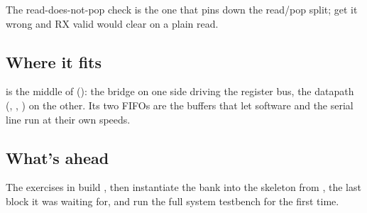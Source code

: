 The read-does-not-pop check is the one that pins down the read/pop split; get it wrong and RX valid
would clear on a plain read.

\subsection{Where it fits}
\label{c5:sec:uart_regs_fits}
 is the middle of  (): the bridge on one side
driving the register bus, the datapath (, , ) on the
other. Its two FIFOs are the buffers that let software and the serial line run at their own speeds.

\subsection{What's ahead}
The exercises in  build , then instantiate the bank into the
 skeleton from , the last block it was waiting for, and run the full
system testbench for the first time.
